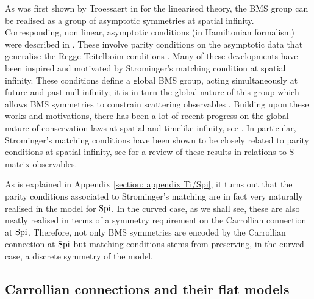 \documentclass[a4paper, 10pt]{article}
\theoremstyle{remark}
\newcommand{\Spi}{\textnormal{Spi}}
\begin{document}
As was first shown by Troessaert in \cite{troessaert_bms4_2018} for the linearised theory, the BMS group can be realised as a group of asymptotic symmetries at spatial infinity. Corresponding, non linear, asymptotic conditions (in Hamiltonian formalism) were described in \cite{Henneaux:2018cst,Henneaux:2019yax}. These involve parity conditions on the asymptotic data that generalise the Regge-Teitelboim conditions \cite{Regge:1974zd}. Many of these developments have been inspired and motivated by Strominger's matching condition \cite{strominger_bms_2014} at spatial infinity. These conditions define a global BMS group, acting simultaneously at future and past null infinity; it is in turn the global nature of this group which allows BMS symmetries to constrain scattering observables \cite{He:2014laa}. Building upon these works and motivations, there has been a lot of recent progress on the global nature of conservation laws at spatial and timelike infinity, see \cite{troessaert_bms4_2018,Henneaux:2018gfi,Henneaux:2018mgn,Prabhu:2019fsp,AliMohamed:2021nuc,Prabhu:2021cgk,Chakraborty:2021sbc,Capone:2022gme,Fuentealba:2022xsz,Mohamed:2023jwv,Fuentealba:2023rvf,Mohamed:2023ttb,Ashtekar:2023zul,Fuentealba:2023hzq,Compere:2023qoa,Fuentealba:2023syb,Ashtekar:2024aa,Gasperin:2024bfc,Fuentealba:2024lll,Fiorucci:2024ndw}. In particular, Strominger's matching conditions have been shown to be closely related to parity conditions at spatial infinity, see \cite{Donnay:2023mrd} for a review of these results in relations to S-matrix observables.

As is explained in Appendix \ref{section: appendix Ti/Spi}, it turns out that the parity conditions associated to Strominger's matching are in fact very naturally realised in the model for $\Spi$. In the curved case, as we shall see, these are also neatly realised in terms of a symmetry requirement on the Carrollian connection at $\Spi$. Therefore, not only BMS symmetries are encoded by the Carrollian connection at $\Spi$ but matching conditions stems from preserving, in the curved case, a discrete symmetry of the model.



\subsection{Carrollian connections and their flat models}\label{ssection: Carrollian connections and their flat models}
\end{document}
